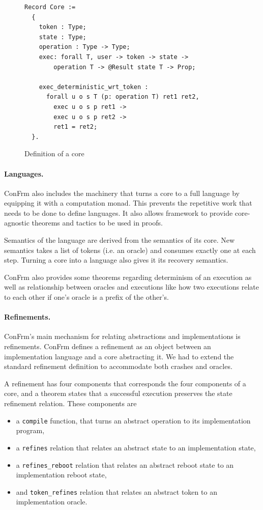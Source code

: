 \begin{figure}[ht]
    \centering
    \begin{verbatim}
Record Core :=
  {
    token : Type;
    state : Type;
    operation : Type -> Type;
    exec: forall T, user -> token -> state ->
        operation T -> @Result state T -> Prop;
    
    exec_deterministic_wrt_token :
      forall u o s T (p: operation T) ret1 ret2,
        exec u o s p ret1 ->
        exec u o s p ret2 ->
        ret1 = ret2;
  }.
    \end{verbatim}
    \caption{Definition of a core}
    \label{fig:Core_Definition}
\end{figure}

\paragraph{Languages.}
ConFrm also includes the machinery that turns a core to a full language by equipping it with a computation monad. This prevents the repetitive work that needs to be done to define languages. It also allows framework to provide core-agnostic theorems and tactics to be used in proofs.

Semantics of the language are derived from the semantics of its core. New  semantics takes a list of tokens (i.e. an oracle) and consumes exactly one at each step. Turning a core into a language also gives it its recovery semantics.

ConFrm also provides some theorems regarding determinism of an execution as well as relationship between oracles and executions like how two executions relate to each other if one's oracle is a prefix of the other's.

\paragraph{Refinements.}
ConFrm's main mechanism for relating abstractions and implementations is refinements. 
ConFrm defines a refinement as an object between an implementation language and a core abstracting it. We had to extend the standard refinement definition to accommodate both crashes and oracles.

A refinement has four components that corresponds the four components of a core, and a theorem states that a successful execution preserves the state refinement relation. These components are
\begin{itemize}
    \item a \texttt{compile} function, that turns an  abstract operation to its implementation program,
    \item a \texttt{refines} relation that relates an abstract state to an implementation state,
    \item a \texttt{refines\_reboot} relation that relates an abstract reboot state to an implementation reboot state,
    \item and  \texttt{token\_refines} relation that relates an abstract token to an implementation oracle.
\end{itemize}

